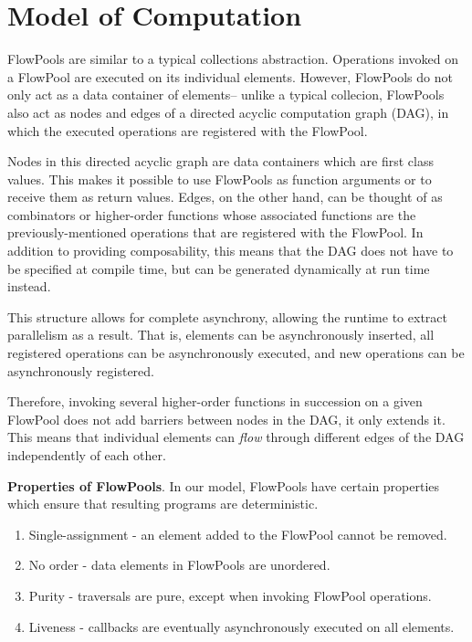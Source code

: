 \documentclass[runningheads,a4paper]{llncs}
\begin{document}


\section{Model of Computation}

FlowPools are similar to a typical collections abstraction.
Operations invoked on a FlowPool are executed on its individual
elements. However, FlowPools do not only act as a data container of
elements-- unlike a typical collecion, FlowPools also act as nodes and edges
of a directed acyclic computation graph (DAG), in which the executed operations 
are registered with the FlowPool.

Nodes in this directed acyclic graph are data containers which are first class
values. This makes it possible to use FlowPools as function arguments or to receive
them as return values. Edges, on the other hand, can be thought of as
combinators or higher-order functions whose associated functions are the
previously-mentioned operations that are registered with the FlowPool. In
addition to providing composability, this means that the DAG does not have to
be specified at compile time, but can be generated dynamically at run time
instead.

This structure allows for complete asynchrony, allowing the runtime to extract
parallelism as a result. That is, elements can be asynchronously inserted, all
registered operations can be asynchronously executed, and new operations can
be asynchronously registered.

Therefore, invoking several higher-order functions in succession on a given
FlowPool does not add barriers between nodes in the DAG, it only extends it.
This means that individual elements can \textit{flow} through different
edges of the DAG independently of each other.

\textbf{Properties of FlowPools}. In our model, FlowPools have certain properties
which ensure that resulting programs are deterministic.

\begin{enumerate}
\item Single-assignment - an element added to the FlowPool cannot be removed.
\item No order - data elements in FlowPools are unordered.
\item Purity - traversals are pure, except when invoking FlowPool operations.
\item Liveness - callbacks are eventually asynchronously executed on all elements.
\end{enumerate}
\end{document}
